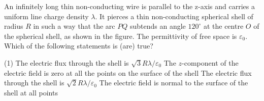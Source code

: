 \item An infinitely long thin non-conducting wire is parallel to the z-axis and carries a uniform line charge density $\lambda$. It pierces a thin non-conducting spherical shell of radius $R$ in such a way that the arc $PQ$ subtends an angle $120^\circ$ at the centre $O$ of the spherical shell, as shown in the figure. The permittivity of free space is $\varepsilon_0$. Which of the following statements is (are) true?
\begin{center}
\end{center}
    \begin{tasks}(1)
        \task The electric flux through the shell is $\sqrt{3}R\lambda/\varepsilon_0$
        \task The $z$-component of the electric field is zero at all the points on the surface of the shell
        \task The electric flux through the shell is $\sqrt{2}R\lambda/\varepsilon_0$
        \task The electric field is normal to the surface of the shell at all points
    \end{tasks}
